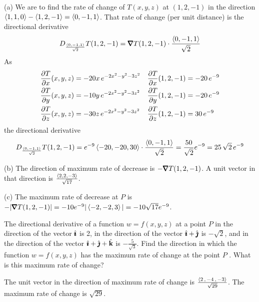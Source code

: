 \begin{solution}
(a) We are to find the rate of change of $T(x,y,z)$ at $(1, 2, -1)$
in the direction $\left< 1, 1, 0\right> - \left< 1, 2, -1\right> = \left< 0,-1,1 \right>$.
That rate of change (per unit distance) is the directional derivative
\begin{align*}
D_{\frac{\llt 0,-1,1 \rgt}{\sqrt{2}}} T(1,2,-1)
=\vnabla T(1,2,-1)\cdot \frac{\llt 0,-1,1 \rgt}{\sqrt{2}}
\end{align*}
As
\begin{align*}
\pdiff{T}{x}(x,y,z)&= -20 x\,e^{-2x^2-y^2-3z^2} &
   \pdiff{T}{x}(1,2,-1)&= -20\, e^{-9} \\
\pdiff{T}{y}(x,y,z)&= -10 y\,e^{-2x^2-y^2-3z^2} &
   \pdiff{T}{y}(1,2,-1)&= -20\, e^{-9} \\
\pdiff{T}{z}(x,y,z)&= -30 z\,e^{-2x^2-y^2-3z^2} &
   \pdiff{T}{z}(1,2,-1)&= 30\, e^{-9} 
\end{align*}
the directional derivative
\begin{align*}
D_{\frac{\left< 0,-1,1 \right>}{\sqrt{2}}} T(1,2,-1)
=e^{-9}\left< -20,-20,30\right>\cdot \frac{\left< 0,-1,1 \right>}{\sqrt{2}}
=\frac{50}{\sqrt{2}}e^{-9} =25\,\sqrt{2}\,e^{-9}
\end{align*}

(b) The direction of maximum rate of decrease is $-\vnabla T(1,2,-1)$.
A unit vector in that direction is $\frac{\left< 2,2,-3\right>}{\sqrt{17}}$.

(c) The maximum rate of decrease at $P$ is 
  $-|\vnabla T(1,2,-1)|=-10 e^{-9} |\llt -2,-2,3\rgt|
                      = -10\sqrt{17} e^{-9}$.
\end{solution}

\begin{question}[M200 2012D] %
The directional derivative of a function $w = f(x, y, z)$ at a point $P$ in the direction
of the vector $\hat{\pmb{\imath}}$ is 2, in the direction of the vector $\hat{\pmb{\imath}}+\hat{\pmb{\jmath}}$ is $-\sqrt{2}$, and 
in the direction of the vector $\hat{\pmb{\imath}}+\hat{\pmb{\jmath}}+\hat{\mathbf{k}}$ is $-\frac{5}{\sqrt{3}}$. 
Find the direction in which the function $w = f(x, y, z)$  has the
maximum rate of change at the point $P$ . What is this maximum rate of change?
\end{question}

%

\begin{answer}
The unit vector in the direction of maximum rate of change is
$\frac{\left< 2\,,\,-4\,,\,-3\right>}{\sqrt{29}}$.
The maximum rate of change is $\sqrt{29}$.
\end{answer}

